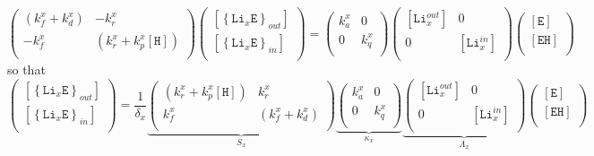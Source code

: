\documentclass[aps,onecolumn,11pt]{revtex4}
\newcommand{\mychem}[1]{\mathtt{#1}}
\newcommand{\myconc}[1]{\left\lbrack{#1}\right\rbrack}
\newcommand{\LiEin}[1]{\myconc{\left\lbrace\mychem{Li}_{#1}\mychem{E}\right\rbrace_{in}}}
\newcommand{\LiEout}[1]{\myconc{\left\lbrace\mychem{Li}_{#1}\mychem{E}\right\rbrace_{out}}}
\newcommand{\LiIn}[1]{\myconc{\mychem{Li}_{#1}^{in}}}
\newcommand{\LiOut}[1]{\myconc{\mychem{Li}_{#1}^{out}}}
\newcommand{\EHin}{\myconc{\mychem{EH}}}
\newcommand{\Eout}{\myconc{\mychem{E}}}
\newcommand{\Hin}{\myconc{\mychem{H}}}
\begin{document}
\begin{equation}
\begin{pmatrix}
	\left(k_f^x+k_d^x\right) & -k_r^x\\
	-k_f^x & \left(k_r^x+k_p^x\Hin\right)\\
\end{pmatrix}
\begin{pmatrix}
	\LiEout{x}\\
	\LiEin{x}\\
\end{pmatrix}
=
	\begin{pmatrix}
	k_a^x & 0 \\
	0     & k_q^x \\
	\end{pmatrix}
	\begin{pmatrix}
	\LiOut{x} & 0 \\
	0     & \LiIn{x} \\
	\end{pmatrix}
	\begin{pmatrix}
	\Eout\\
	\EHin\\
	\end{pmatrix}
\end{equation}
so that
\begin{equation}
	\begin{pmatrix}
	\LiEout{x}\\
	\LiEin{x}\\
\end{pmatrix}
= \dfrac{1}{\delta_x} 
\underbrace{
\begin{pmatrix}
	\left(k_r^x+k_p^x\Hin\right) & k_r^x\\
	k_f^x & \left(k_f^x+k_d^x\right)\\
\end{pmatrix}}_{S_x}
\underbrace{
\begin{pmatrix}
	k_a^x & 0 \\
	0     & k_q^x \\
	\end{pmatrix}
		}_{\kappa_x}
\underbrace{
	\begin{pmatrix}
	\LiOut{x} & 0 \\
	0     & \LiIn{x} \\
	\end{pmatrix}
}_{\Lambda_x}
	\begin{pmatrix}
	\Eout\\
	\EHin\\
	\end{pmatrix}
\end{equation}
\end{document}
